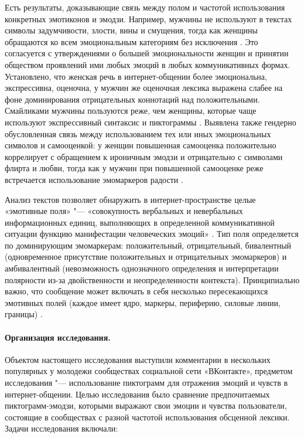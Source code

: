 Есть результаты, доказывающие связь между полом и частотой использования конкретных эмотиконов и эмодзи. Например, мужчины не используют в текстах символы задумчивости, злости, вины и смущения, тогда как женщины обращаются ко всем эмоциональным категориям без исключения \cite{BelousovObukhova}. Это согласуется с утверждениями о большей эмоциональности женщин и принятии обществом проявлений ими любых эмоций в любых коммуникативных формах. Установлено, что женская речь в интернет-общении более эмоциональна, экспрессивна, оценочна, у мужчин же оценочная лексика выражена слабее на фоне доминирования отрицательных коннотаций над положительными. Смайликами мужчины пользуются реже, чем женщины, которые чаще используют экспрессивный синтаксис и пиктограммы \cite{NovikovaVerentsova}. Выявлена также гендерно обусловленная связь между использованием тех или иных эмоциональных символов и самооценкой: у женщин повышенная самооценка положительно коррелирует с обращением к ироничным эмодзи и отрицательно с символами флирта и любви, тогда как у мужчин при повышенной самооценке реже встречается использование эмомаркеров радости \cite{BelousovObukhova}.

Анализ текстов позволяет обнаружить в интернет-пространстве целые «эмотивные поля» "--- «совокупность вербальных и невербальных информационных единиц, выполняющих в определенной коммуникативной ситуации функцию манифестации человеческих эмоций» \cite[c.~125]{10}. Тип поля определяется по доминирующим эмомаркерам: положительный, отрицательный, бивалентный (одновременное присутствие положительных и отрицательных эмомаркеров) и амбивалентный (невозможность однозначного определения и интерпретации полярности из-за двойственности и неопределенности контекста). Принципиально важно, что сообщение может включать в себя несколько пересекающихся эмотивных полей (каждое имеет ядро, маркеры, периферию, силовые линии, границы) \cite{Mozgovaya}.

\paragraph{Организация исследования.} Объектом настоящего исследования выступили комментарии в нескольких популярных у молодежи сообществах социальной сети «ВКонтакте», предметом исследования "--- использование пиктограмм для отражения эмоций и чувств в интернет-общении. Целью исследования было сравнение предпочитаемых пиктограмм-эмодзи, которыми выражают свои эмоции и чувства пользователи, состоящие в сообществах с разной частотой использования обсценной лексики. Задачи исследования включали:

